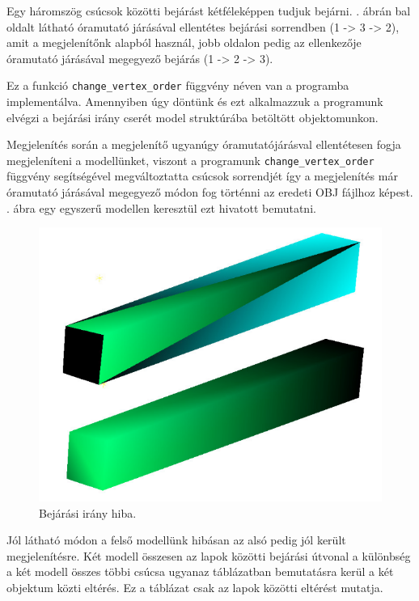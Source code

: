 Egy háromszög csúcsok közötti bejárást kétféleképpen tudjuk bejárni. . ábrán bal oldalt látható  óramutató járásával ellentétes bejárási sorrendben (1 -> 3 -> 2), amit a megjelenítőnk alapból használ, jobb oldalon pedig az ellenkezője óramutató járásával megegyező bejárás (1 -> 2 -> 3).

Ez a funkció \texttt{change\_vertex\_order} függvény néven van a programba implementálva. Amennyiben úgy döntünk és ezt alkalmazzuk a programunk elvégzi a bejárási irány cserét model struktúrába betöltött objektomunkon.

Megjelenítés során a megjelenítő ugyanúgy óramutatójárásval ellentétesen fogja megjeleníteni a modellünket, viszont a programunk \texttt{change\_vertex\_order} függvény segítségével megváltoztatta csúcsok sorrendjét így a megjelenítés már óramutató járásával megegyező módon fog történni az eredeti OBJ fájlhoz képest.\\
\newpage
{}. ábra egy egyszerű modellen keresztül ezt hivatott bemutatni.
\bigskip
\begin{figure}[h]
\centering
\includegraphics[scale=0.5]{images/order.png}
\caption{Bejárási irány hiba.}
\label{fig:bej2}
\end{figure}
\bigskip

Jól látható módon a felső modellünk hibásan az alsó pedig jól került megjelenítésre. Két modell összesen az lapok közötti bejárási útvonal a különbség a két modell összes többi csúcsa ugyanaz  táblázatban bemutatásra kerül a két objektum közti eltérés. Ez a táblázat csak az lapok közötti eltérést mutatja.

